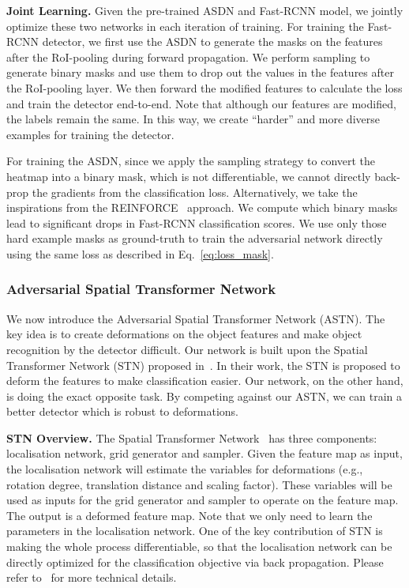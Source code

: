 \documentclass[10pt,twocolumn,letterpaper]{article}
\begin{document}
\textbf{Joint Learning.}  Given the pre-trained ASDN and Fast-RCNN model, we jointly optimize these two networks in each iteration of training. For training the Fast-RCNN detector, we first use the ASDN to generate the masks on the features after the RoI-pooling during forward propagation. We perform sampling to generate binary masks and use them to drop out the values in the features after the RoI-pooling layer. We then forward the modified features to calculate the loss and train the detector end-to-end. Note that although our features are modified, the labels remain the same. In this way, we create ``harder'' and more diverse examples for training the detector. 

For training the ASDN, since we apply the sampling strategy to convert the heatmap into a binary mask, which is not differentiable, we cannot directly back-prop the gradients from the classification loss. Alternatively, we take the inspirations  from the REINFORCE~\cite{reinforce} approach. We compute  which binary masks lead to significant drops in Fast-RCNN classification scores. We use only those hard example masks as ground-truth to train the adversarial network directly using the same loss as described in Eq.~\ref{eq:loss_mask}.




\vspace{-0.05in}
\subsubsection{Adversarial Spatial Transformer Network}
\vspace{-0.05in}
We now introduce the Adversarial Spatial Transformer Network (ASTN). The key idea is to create deformations on the object features and make object recognition by the detector difficult. Our network is built upon the Spatial Transformer Network (STN) proposed in~\cite{stn15}. In their work, the STN is proposed to deform the features to make classification easier. Our network, on the other hand, is doing the exact opposite task. By competing against our ASTN, we can train a better detector which is robust to deformations. 

\textbf{STN Overview.} The Spatial Transformer Network~\cite{stn15} has three components: localisation network, grid generator and sampler. Given the feature map as input, the localisation network will estimate the variables for deformations (e.g., rotation degree, translation distance and scaling factor). These variables will be used as inputs for the grid generator and sampler to operate on the feature map. The output is a deformed feature map. Note that we only need to learn the parameters in the localisation network. One of the key contribution of STN is making the whole process differentiable, so that the localisation network can be directly optimized for the classification objective via back propagation. Please refer to~\cite{stn15} for more technical details. 
\end{document}

